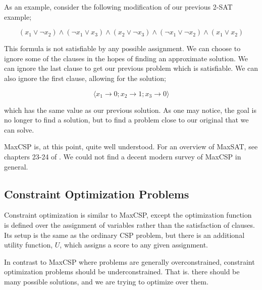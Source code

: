 As an example, consider the following modification of our previous 2-SAT example;

\begin{equation}\label{equation:two-sat-example-pt1}
    (x_1 \lor \neg x_2) \land (\neg x_1 \lor x_3) \land (x_2 \lor \neg x_3) \land (\neg x_1 \lor \neg x_2) \land (x_1 \lor x_2)
\end{equation}

This formula is not satisfiable by any possible assignment. We can choose to ignore some of the clauses in the hopes of finding an approximate solution. We can ignore the last clause to get our previous problem which is satisfiable. We can also ignore the first clause, allowing for the solution;

\begin{equation}
    \langle x_1 \rightarrow 0; x_2 \rightarrow 1; x_3 \rightarrow 0\rangle
\end{equation}

which has the same value as our previous solution. As one may notice, the goal is no longer to find a solution, but to find a problem close to our original that we can solve.

MaxCSP is, at this point, quite well understood. For an overview of MaxSAT, see chapters 23-24 of \citep{biere2009handbook}. We could not find a decent modern survey of MaxCSP in general. 



\subsection{Constraint Optimization Problems}\label{sec:constraint-ptimization}

Constraint optimization is similar to MaxCSP, except the optimization function is defined over the assignment of variables rather than the satisfaction of clauses. Its setup is the same as the ordinary CSP problem, but there is an additional utility function, $U$, which assigns a score to any given assignment.

In contrast to MaxCSP where problems are generally overconstrained, constraint optimization problems should be underconstrained. That is. there should be many possible solutions, and we are trying to optimize over them.

